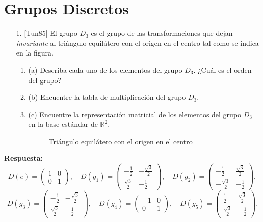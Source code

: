 \documentclass[a4paper,12pt]{article}
\begin{document}
\newpage

\section*{Grupos Discretos}

\begin{enumerate}
    \item [1.] [Tun85] El grupo $D_3$ es el grupo de las transformaciones que dejan \textit{invariante} al triángulo equilátero con el origen en el centro tal como se indica en la figura.
    \begin{enumerate}
        \item (a) Describa cada uno de los elementos del grupo $D_3$. ¿Cuál es el orden del grupo?
        \item (b) Encuentre la tabla de multiplicación del grupo $D_3$.
        \item (c) Encuentre la representación matricial de los elementos del grupo $D_3$ en la base estándar de $\mathbb{R}^2$.

    \begin{figure}[h]
        \centering
        \caption{Triángulo equilátero con el origen en el centro}
    \end{figure}
    \end{enumerate}
\end{enumerate}

\textbf{Respuesta:}
$$
D(e) = \begin{pmatrix} 1 & 0 \\ 0 & 1 \end{pmatrix}, \quad D(g_1) = \begin{pmatrix} -\frac{1}{2} & -\frac{\sqrt{3}}{2} \\ \frac{\sqrt{3}}{2} & -\frac{1}{2} \end{pmatrix}, \quad D(g_2) = \begin{pmatrix} -\frac{1}{2} & \frac{\sqrt{3}}{2} \\ -\frac{\sqrt{3}}{2} & -\frac{1}{2} \end{pmatrix},
$$
$$
D(g_3) = \begin{pmatrix} -\frac{1}{2} & -\frac{\sqrt{3}}{2} \\ \frac{\sqrt{3}}{2} & -\frac{1}{2} \end{pmatrix}, \quad D(g_4) = \begin{pmatrix} -1 & 0 \\ 0 & 1 \end{pmatrix}, \quad D(g_5) = \begin{pmatrix} \frac{1}{2} & \frac{\sqrt{3}}{2} \\ \frac{\sqrt{3}}{2} & -\frac{1}{2} \end{pmatrix}.
$$
\end{document}
